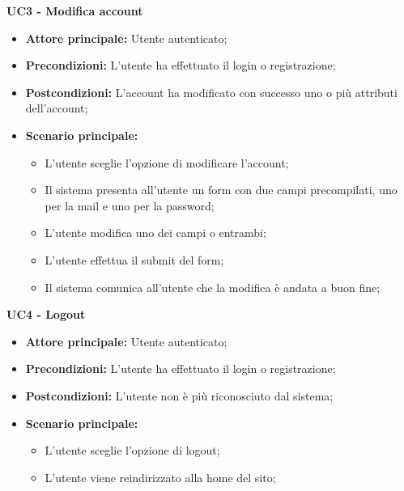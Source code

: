 
\textbf{UC3 - Modifica account}
\begin{itemize}
    \item \textbf{Attore principale: }Utente autenticato;
    \item \textbf{Precondizioni: }L'utente ha effettuato il login o registrazione;
    \item \textbf{Postcondizioni: }L'account ha modificato con successo uno o più attributi dell'account;
    \item \textbf{Scenario principale:} 
        \begin{itemize}
            \item L'utente sceglie l'opzione di modificare l'account;
            \item Il sistema presenta all'utente un form con due campi precompilati, uno per la mail e uno per la password;
            \item L'utente modifica uno dei campi o entrambi;
            \item L'utente effettua il submit del form;
            \item Il sistema comunica all'utente che la modifica è andata a buon fine;
        \end{itemize}
\end{itemize}

\textbf{UC4 - Logout}
\begin{itemize}
    \item \textbf{Attore principale: }Utente autenticato;
    \item \textbf{Precondizioni: }L'utente ha effettuato il login o registrazione;
    \item \textbf{Postcondizioni: }L'utente non è più riconosciuto dal sistema;
    \item \textbf{Scenario principale:} 
        \begin{itemize}
            \item L'utente sceglie l'opzione di logout;
            \item L'utente viene reindirizzato alla home del sito;
        \end{itemize}
\end{itemize}
